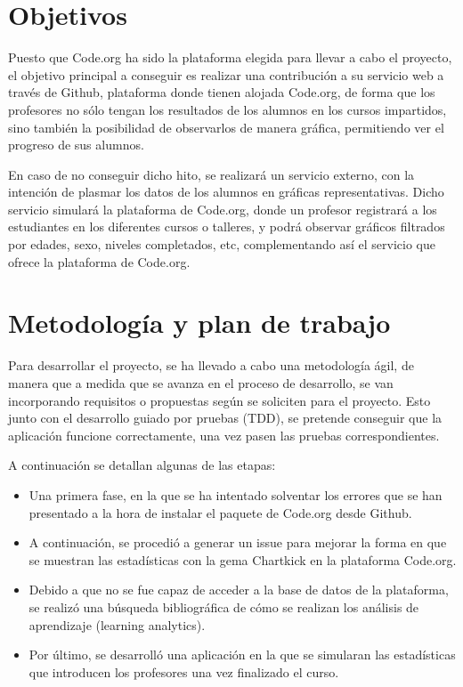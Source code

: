 \section{Objetivos}
\label{1:sec:2}

Puesto que Code.org ha sido la plataforma elegida para llevar a cabo el proyecto, el objetivo principal a conseguir es realizar una contribución a su servicio web a través de Github, plataforma donde tienen alojada Code.org, de forma que los profesores no sólo tengan los resultados de los alumnos en los cursos impartidos, sino también la posibilidad de
observarlos de manera gráfica, permitiendo ver el progreso de sus alumnos.

En caso de no conseguir dicho hito, se realizará un servicio externo, con la intención de plasmar los datos de los alumnos en gráficas representativas. Dicho servicio simulará la plataforma de Code.org, donde un profesor registrará a los estudiantes en los diferentes cursos o talleres, y podrá observar gráficos filtrados por edades, sexo, niveles completados, etc,
complementando así el servicio que ofrece la plataforma de Code.org.

\section{Metodología y plan de trabajo}
\label{1:sec:3}

Para desarrollar el proyecto, se ha llevado a cabo una metodología ágil, de manera que a medida que se avanza en el proceso de desarrollo, se van incorporando requisitos o propuestas según se soliciten para el proyecto. Esto junto con el desarrollo guiado por pruebas (TDD), se pretende conseguir que la aplicación funcione correctamente, una vez pasen las pruebas correspondientes.

A continuación se detallan algunas de las etapas:

\begin{itemize}
  \item Una primera fase, en la que se ha intentado solventar los errores que se han presentado a la hora de instalar el paquete de Code.org desde Github.
  \item A continuación, se procedió a generar un issue para mejorar la forma en que se muestran las estadísticas con la gema Chartkick en la plataforma Code.org.
  \item Debido a que no se fue capaz de acceder a la base de datos de la plataforma, se realizó una búsqueda bibliográfica de cómo se realizan los análisis de aprendizaje (learning analytics).
  \item Por último, se desarrolló una aplicación en la que se simularan las estadísticas que introducen los profesores una vez finalizado el curso.
\end{itemize}


